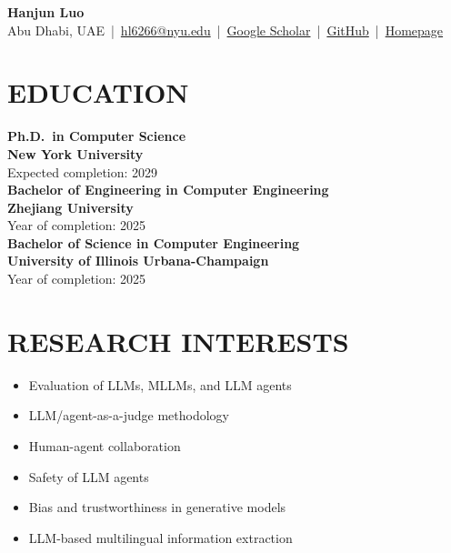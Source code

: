 \documentclass[a4paper,9pt]{extarticle}
\begin{document}
\pagestyle{empty}

\begin{center}
\textbf{\Large Hanjun Luo}\\[3pt]
Abu Dhabi, UAE \,|\, \href{mailto:hl6266@nyu.edu}{hl6266@nyu.edu} \,|\, 
\href{https://scholar.google.com/citations?user=RcWubw8AAAAJ&hl=en}{Google Scholar} \,|\, 
\href{https://github.com/Astarojth}{GitHub} \,|\, 
\href{https://astarojth.github.io/}{Homepage}
\end{center}

\section*{EDUCATION}
\noindent
\textbf{Ph.D.~in Computer Science} \\
\textbf{New York University} \\
Expected completion: 2029\\

\noindent
\textbf{Bachelor of Engineering in Computer Engineering} \\
\textbf{Zhejiang University} \\
Year of completion: 2025\\

\noindent
\textbf{Bachelor of Science in Computer Engineering} \\
\textbf{University of Illinois Urbana-Champaign} \\
Year of completion: 2025

\section*{RESEARCH INTERESTS}
\vspace{-0.3\baselineskip}
\begin{itemize}[topsep=3pt,itemsep=1pt]
  \item Evaluation of LLMs, MLLMs, and LLM agents
  \item LLM/agent-as-a-judge methodology
  \item Human-agent collaboration
  \item Safety of LLM agents
  \item Bias and trustworthiness in generative models
  \item LLM-based multilingual information extraction
\end{itemize}
\end{document}
